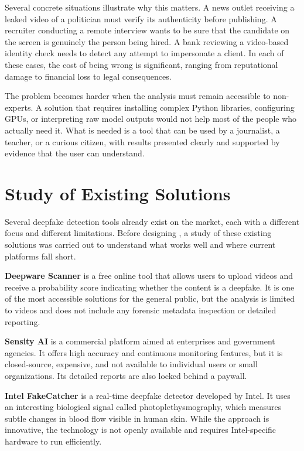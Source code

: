 Several concrete situations illustrate why this matters. A news outlet receiving a leaked video of a politician must verify its authenticity before publishing. A recruiter conducting a remote interview wants to be sure that the candidate on the screen is genuinely the person being hired. A bank reviewing a video-based identity check needs to detect any attempt to impersonate a client. In each of these cases, the cost of being wrong is significant, ranging from reputational damage to financial loss to legal consequences.

The problem becomes harder when the analysis must remain accessible to non-experts. A solution that requires installing complex Python libraries, configuring GPUs, or interpreting raw model outputs would not help most of the people who actually need it. What is needed is a tool that can be used by a journalist, a teacher, or a curious citizen, with results presented clearly and supported by evidence that the user can understand.

\section{Study of Existing Solutions}

Several deepfake detection tools already exist on the market, each with a different focus and different limitations. Before designing \projectname{}, a study of these existing solutions was carried out to understand what works well and where current platforms fall short.

\textbf{Deepware Scanner} is a free online tool that allows users to upload videos and receive a probability score indicating whether the content is a deepfake. It is one of the most accessible solutions for the general public, but the analysis is limited to videos and does not include any forensic metadata inspection or detailed reporting.

\textbf{Sensity AI} is a commercial platform aimed at enterprises and government agencies. It offers high accuracy and continuous monitoring features, but it is closed-source, expensive, and not available to individual users or small organizations. Its detailed reports are also locked behind a paywall.

\textbf{Intel FakeCatcher} is a real-time deepfake detector developed by Intel. It uses an interesting biological signal called photoplethysmography, which measures subtle changes in blood flow visible in human skin. While the approach is innovative, the technology is not openly available and requires Intel-specific hardware to run efficiently.

